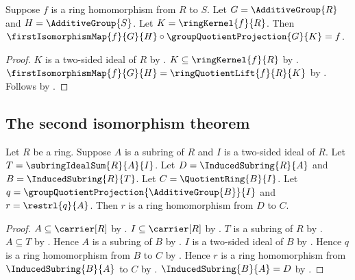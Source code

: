 \begin{theorem}\label{ring_first_isomorphism_factorization}
    Suppose $f$ is a ring homomorphism from $R$ to $S$.
    Let $G=\AdditiveGroup{R}$ and $H=\AdditiveGroup{S}$.
    Let $K=\ringKernel{f}{R}$.
    Then
        $\firstIsomorphismMap{f}{G}{H}\circ
            \groupQuotientProjection{G}{K}=f$.
\end{theorem}
\begin{proof}
    $K$ is a two-sided ideal of $R$ by
        .
    $K\subseteq\ringKernel{f}{R}$ by .
    $\firstIsomorphismMap{f}{G}{H}
        =\ringQuotientLift{f}{R}{K}$ by
        .
    Follows by .
\end{proof}

\subsection{The second isomorphism theorem}

\begin{theorem}\label{ring_second_isomorphism_restriction_hom}
    Let $R$ be a ring.
    Suppose $A$ is a subring of $R$ and
        $I$ is a two-sided ideal of $R$.
    Let $T=\subringIdealSum{R}{A}{I}$.
    Let $D=\InducedSubring{R}{A}$ and $B=\InducedSubring{R}{T}$.
    Let $C=\QuotientRing{B}{I}$.
    Let $q=\groupQuotientProjection{\AdditiveGroup{B}}{I}$ and
        $r=\restrl{q}{A}$.
    Then $r$ is a ring homomorphism from $D$ to $C$.
\end{theorem}
\begin{proof}
    $A\subseteq\carrier[R]$ by .
    $I\subseteq\carrier[R]$ by
        .
    $T$ is a subring of $R$ by .
    $A\subseteq T$ by .
    Hence $A$ is a subring of $B$ by
        .
    $I$ is a two-sided ideal of $B$ by
        .
    Hence $q$ is a ring homomorphism from $B$ to $C$ by
        .
    Hence $r$ is a ring homomorphism from
        $\InducedSubring{B}{A}$ to $C$ by
        .
    $\InducedSubring{B}{A}=D$ by
        .
\end{proof}

